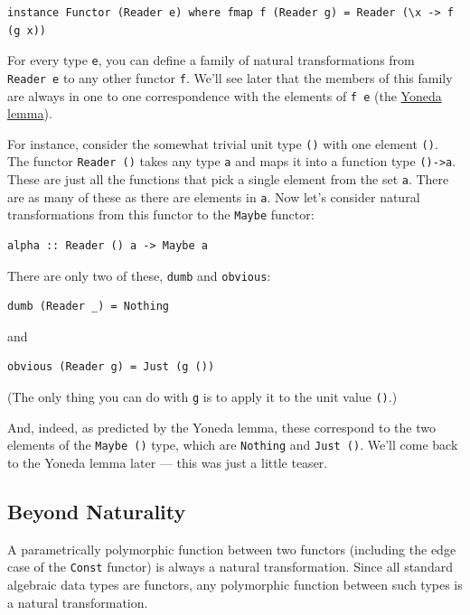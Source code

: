 \begin{verbatim}
instance Functor (Reader e) where fmap f (Reader g) = Reader (\x -> f (g x))
\end{verbatim}

For every type \texttt{e}, you can define a family of natural
transformations from \texttt{Reader\ e} to any other functor \texttt{f}.
We'll see later that the members of this family are always in one to one
correspondence with the elements of \texttt{f\ e} (the
\href{https://bartoszmilewski.com/2015/09/01/the-yoneda-lemma/}{Yoneda
lemma}).

For instance, consider the somewhat trivial unit type \texttt{()} with
one element \texttt{()}. The functor \texttt{Reader\ ()} takes any type
\texttt{a} and maps it into a function type \texttt{()-\textgreater{}a}.
These are just all the functions that pick a single element from the set
\texttt{a}. There are as many of these as there are elements in
\texttt{a}. Now let's consider natural transformations from this functor
to the \texttt{Maybe} functor:

\begin{verbatim}
alpha :: Reader () a -> Maybe a
\end{verbatim}

There are only two of these, \texttt{dumb} and \texttt{obvious}:

\begin{verbatim}
dumb (Reader _) = Nothing
\end{verbatim}

and

\begin{verbatim}
obvious (Reader g) = Just (g ())
\end{verbatim}

(The only thing you can do with \texttt{g} is to apply it to the unit
value \texttt{()}.)

And, indeed, as predicted by the Yoneda lemma, these correspond to the
two elements of the \texttt{Maybe\ ()} type, which are \texttt{Nothing}
and \texttt{Just\ ()}. We'll come back to the Yoneda lemma later ---
this was just a little teaser.

\subsection{Beyond Naturality}\label{beyond-naturality}

A parametrically polymorphic function between two functors (including
the edge case of the \texttt{Const} functor) is always a natural
transformation. Since all standard algebraic data types are functors,
any polymorphic function between such types is a natural transformation.

